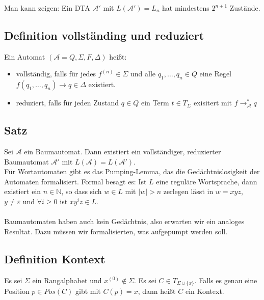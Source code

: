 \documentclass[titlepage]{article}
\begin{document}
Man kann zeigen: Ein DTA $\mathcal{A}'$ mit $L(\mathcal{A}') = L_n$ hat mindestens 
$2^{n+1}$ Zust\"ande.

\subsection{Definition vollst\"anding und reduziert}

Ein Automat $(\mathcal{A} = Q, \Sigma, F, \Delta)$ hei\ss t:

\begin{itemize}
    \item vollst\"andig, falls f\"ur jedes $f^{(n)} \in \Sigma$ und alle 
        $q_1, \dots , q_n \in Q$ eine Regel 
        $f(q_1, \dots, q_n) \rightarrow q \in \Delta$ existiert.
    \item reduziert, falls f\"ur jeden Zustand $q \in Q$ ein Term $t \in T_\Sigma$ 
        exisitert mit $f \rightarrow ^\ast_\mathcal{A} q$
\end{itemize}

\subsection{Satz}

Sei $\mathcal{A}$ ein Baumautomat. Dann existiert ein vollst\"andiger, reduzierter 
Baumautomat $\mathcal{A}'$ mit $L(\mathcal{A}) = L(\mathcal{A}')$.\\

F\"ur Wortautomaten gibt es das Pumping-Lemma, das die Ged\"achtnislosigkeit der 
Automaten formalisiert.
Formal besagt es: Ist $L$ eine regul\"are Wortsprache, dann existiert ein 
$n \in \mathbb{N}$, so dass sich $w \in L$ mit $|w| > n$ 
zerlegen l\"asst in $w = xyz$, $y \neq \varepsilon$ und 
$\forall i \geq 0$ ist $xy^iz \in L$. \\ \\

Baumautomaten haben auch kein Ged\"achtnis, also erwarten wir ein analoges Resultat.
Dazu m\"ussen wir formalisierten, was \glqq aufgepumpt \grqq werden soll.

\subsection{Definition Kontext}

Es sei $\Sigma$ ein Rangalphabet und $x^{(0)} \notin \Sigma$. Es sei 
$C \in T_{\Sigma \cup \{x\}}$.
Falls es genau eine Position $p \in Pos(C)$ gibt mit $C(p) = x$, dann hei\ss t $C$ 
ein Kontext.\\
\end{document}
